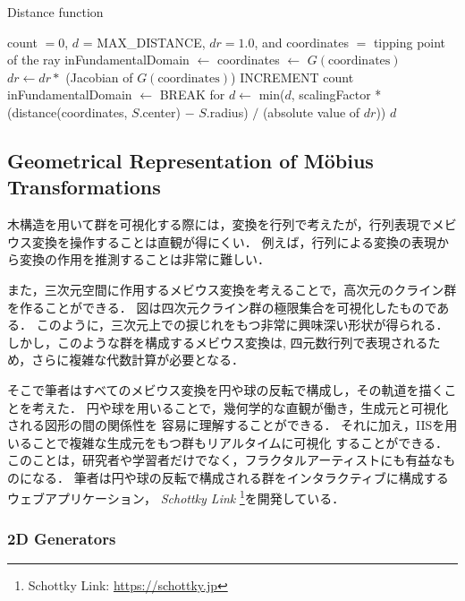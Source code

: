 \begin{algorithm}
 \caption{Distance function}
 \label{iis3d}
 \begin{algorithmic}
  \REQUIRE count $= 0$, $d$ = MAX\_DISTANCE, $dr = 1.0$, and coordinates $=$ tipping
  point of the ray
  \STATE inFundamentalDomain $\leftarrow$ \TRUE
  \STATE coordinates $\leftarrow$ $G(\text{coordinates})$
  \STATE $dr \leftarrow dr * $ (Jacobian of $G(\text{coordinates})$)
  \STATE INCREMENT count
  \STATE inFundamentalDomain $\leftarrow$ \FALSE
  \ENDIF
  \ENDFOR
  \STATE BREAK for
  \ENDIF
  \ENDFOR
  \STATE $d \leftarrow$ min($d$, scalingFactor * (distance(coordinates, $S$.center) $-$
  $S$.radius) $/$ (absolute value of $dr$))
  \ENDFOR
  \RETURN $d$
 \end{algorithmic}
\end{algorithm}

\subsection{Geometrical Representation of M\"obius Transformations}

木構造を用いて群を可視化する際には，変換を行列で考えたが，行列表現でメビ
ウス変換を操作することは直観が得にくい．
例えば，行列による変換の表現から変換の作用を推測することは非常に難しい．

また，三次元空間に作用するメビウス変換を考えることで，高次元のクライン群を作ることができる．
図は四次元クライン群の極限集合を可視化したものである．
このように，三次元上での捩じれをもつ非常に興味深い形状が得られる．
しかし，このような群を構成するメビウス変換は,
四元数行列で表現されるため，さらに複雑な代数計算が必要となる．

そこで筆者はすべてのメビウス変換を円や球の反転で構成し，その軌道を描くことを考えた．
円や球を用いることで，幾何学的な直観が働き，生成元と可視化される図形の間の関係性を
容易に理解することができる．
それに加え，IISを用いることで複雑な生成元をもつ群もリアルタイムに可視化
することができる．
このことは，研究者や学習者だけでなく，フラクタルアーティストにも有益なも
のになる．
筆者は円や球の反転で構成される群をインタラクティブに構成するウェブアプリケーション，
{\it Schottky Link} \footnote{Schottky Link:
\url{https://schottky.jp}}を開発している．

\subsubsection{2D Generators}

